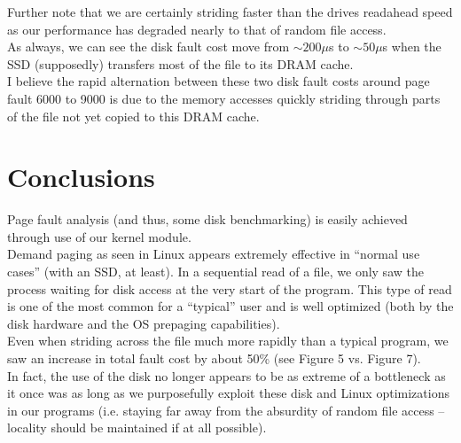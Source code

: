 \documentclass{article}
\begin{document}
	Further note that we are certainly striding faster than the drives readahead speed as our performance has degraded nearly to that of random file access.\\
	
	As always, we can see the disk fault cost move from $\sim$$200 \mu$s to $\sim$$50 \mu$s when the SSD (supposedly) transfers most of the file to its DRAM cache.\\
	
	I believe the rapid alternation between these two disk fault costs around page fault 6000 to 9000 is due to the memory accesses quickly striding through parts of the file not yet copied to this DRAM cache.
	
\section{Conclusions}

	Page fault analysis (and thus, some disk benchmarking) is easily achieved through use of our kernel module.\\

	Demand paging as seen in Linux appears extremely effective in ``normal use cases'' (with an SSD, at least). In a sequential read of a file, we only saw the process waiting for disk access at the very start of the program. This type of read is one of the most common for a ``typical'' user and is well optimized (both by the disk hardware and the OS prepaging capabilities).\\
	
	Even when striding across the file much more rapidly than a typical program, we saw an increase in total fault cost by about 50\% (see Figure 5 vs. Figure 7).\\
	
	In fact, the use of the disk no longer appears to be as extreme of a bottleneck as it once was as long as we purposefully exploit these disk and Linux optimizations in our programs (i.e. staying far away from the absurdity of random file access -- locality should be maintained if at all possible).
\end{document}
